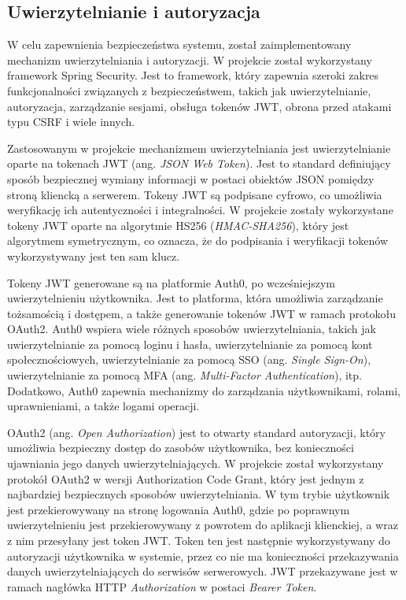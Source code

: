 \subsection{Uwierzytelnianie i autoryzacja}

W celu zapewnienia bezpieczeństwa systemu, został zaimplementowany mechanizm uwierzytelniania i autoryzacji. W projekcie został wykorzystany framework Spring Security. Jest to framework, który zapewnia szeroki zakres funkcjonalności związanych z bezpieczeństwem, takich jak uwierzytelnianie, autoryzacja, zarządzanie sesjami, obsługa tokenów JWT, obrona przed atakami typu CSRF i wiele innych.

Zastosowanym w projekcie mechanizmem uwierzytelniania jest uwierzytelnianie oparte na tokenach JWT (ang. \textit{JSON Web Token}). Jest to standard definiujący sposób bezpiecznej wymiany informacji w postaci obiektów JSON pomiędzy stroną kliencką a serwerem. Tokeny JWT są podpisane cyfrowo, co umożliwia weryfikację ich autentyczności i integralności. W projekcie zostały wykorzystane tokeny JWT oparte na algorytmie HS256 (\textit{HMAC-SHA256}), który jest algorytmem symetrycznym, co oznacza, że do podpisania i weryfikacji tokenów wykorzystywany jest ten sam klucz. 

Tokeny JWT generowane są na platformie Auth0, po wcześniejszym uwierzytelnieniu użytkownika. Jest to platforma, która umożliwia zarządzanie tożsamością i dostępem, a także generowanie tokenów JWT w ramach protokołu OAuth2. Auth0 wspiera wiele różnych sposobów uwierzytelniania, takich jak uwierzytelnianie za pomocą loginu i hasła, uwierzytelnianie za pomocą kont społecznościowych, uwierzytelnianie za pomocą SSO (ang. \textit{Single Sign-On}), uwierzytelnianie za pomocą MFA (ang. \textit{Multi-Factor Authentication}), itp. Dodatkowo, Auth0 zapewnia mechanizmy do zarządzania użytkownikami, rolami, uprawnieniami, a także logami operacji.

OAuth2 (ang. \textit{Open Authorization}) jest to otwarty standard autoryzacji, który umożliwia bezpieczny dostęp do zasobów użytkownika, bez konieczności ujawniania jego danych uwierzytelniających. W projekcie został wykorzystany protokół OAuth2 w wersji Authorization Code Grant, który jest jednym z najbardziej bezpiecznych sposobów uwierzytelniania. W tym trybie użytkownik jest przekierowywany na stronę logowania Auth0, gdzie po poprawnym uwierzytelnieniu jest przekierowywany z powrotem do aplikacji klienckiej, a wraz z nim przesyłany jest token JWT. Token ten jest następnie wykorzystywany do autoryzacji użytkownika w systemie, przez co nie ma konieczności przekazywania danych uwierzytelniających do serwisów serwerowych. JWT przekazywane jest w ramach nagłówka HTTP \textit{Authorization} w postaci \textit{Bearer Token}.

